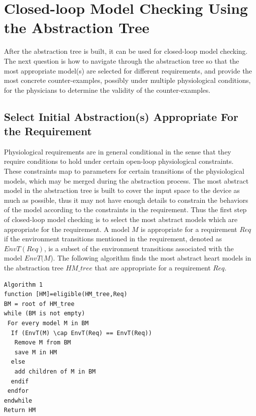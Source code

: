 \section{Closed-loop Model Checking Using the Abstraction Tree}
After the abstraction tree is built, it can be used for closed-loop model checking. The next question is how to navigate through the abstraction tree so that the most appropriate model(s) are selected for different requirements, and provide the most concrete counter-examples, possibly under multiple physiological conditions, for the physicians to determine the validity of the counter-examples.
\subsection{Select Initial Abstraction(s) Appropriate For the Requirement}
Physiological requirements are in general conditional in the sense that they require conditions to hold under certain open-loop physiological constraints. These constraints map to parameters for certain transitions of the physiological models, which may be merged during the abstraction process.
The most abstract model in the abstraction tree is built to cover the input space to the device as much as possible, thus it may not have enough details to constrain the behaviors of the model according to the constraints in the requirement. Thus the first step of closed-loop model checking is to select the most abstract models which are appropriate for the requirement. A model $M$ is appropriate for a requirement $Req$ if the environment transitions mentioned in the requirement, denoted as $EnvT(Req)$, is a subset of the environment transitions associated with the model $EnvT(M$). The following algorithm finds the most abstract heart models in the abstraction tree $HM\_tree$ that are appropriate for a requirement $Req$.
\begin{Verbatim}
Algorithm 1
function [HM]=eligible(HM_tree,Req)
BM = root of HM_tree
while (BM is not empty)
 For every model M in BM
  If (EnvT(M) \cap EnvT(Req) == EnvT(Req))
   Remove M from BM
   save M in HM
  else
   add children of M in BM
  endif
 endfor
endwhile
Return HM
\end{Verbatim}
